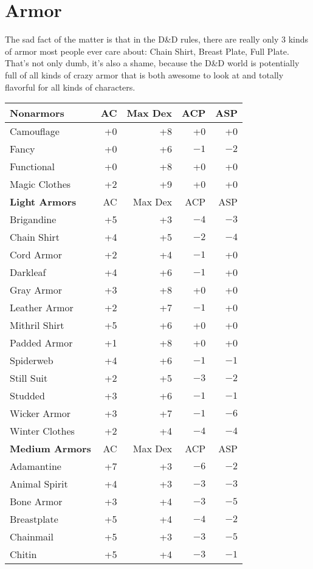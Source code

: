 \section{Armor}

The sad fact of the matter is that in the D\&D rules, there are really only 3 kinds of armor most people ever care about: Chain Shirt, Breast Plate, Full Plate. That's not only dumb, it's also a shame, because the D\&D world is potentially full of all kinds of crazy armor that is both awesome to look at and totally flavorful for all kinds of characters.



\begin{multicols}{2}
\begin{small}
\noindent \begin{tabular}{|lrrrr|}\hline
\parbox[c][12pt]{1pt}{}\textbf{Nonarmors}&AC&Max Dex&ACP&ASP\\\hline
\parbox[c][12pt]{1pt}{}Camouflage&+0&+8&+0&+0\\
Fancy&+0&+6&$-1$&$-2$\\
Functional&+0&+8&+0&+0\\
Magic Clothes& +2&+9&+0&+0\\\hline
\parbox[c][12pt]{1pt}{}\textbf{Light Armors}&AC&Max Dex&ACP&ASP\\\hline
\parbox[c][12pt]{1pt}{}Brigandine&+5&+3&$-4$&$-3$\\
Chain Shirt&+4&+5&$-2$&$-4$\\
Cord Armor&+2&+4&$-1$&+0\\
Darkleaf&+4&+6&$-1$&+0\\
Gray Armor&+3&+8&+0&+0\\
Leather Armor&+2&+7&$-1$&+0\\
Mithril Shirt&+5&+6&+0&+0\\
Padded Armor&+1&+8&+0&+0\\
Spiderweb&+4&+6&$-1$&$-1$\\
Still Suit&+2&+5&$-3$&$-2$\\
Studded&+3&+6&$-1$&$-1$\\
Wicker Armor&+3&+7&$-1$&$-6$\\
Winter Clothes&+2&+4&$-4$&$-4$\\\hline
\parbox[c][12pt]{1pt}{}\textbf{Medium Armors}&AC&Max Dex&ACP&ASP\\\hline
\parbox[c][12pt]{1pt}{}Adamantine&+7&+3&$-6$&$-2$\\
Animal Spirit&+4&+3&$-3$&$-3$\\
Bone Armor&+3&+4&$-3$&$-5$\\
Breastplate&+5&+4&$-4$&$-2$\\
Chainmail&+5&+3&$-3$&$-5$\\
Chitin&+5&+4&$-3$&$-1$\\\hline
\end{tabular}



\end{small}
\end{multicols}
